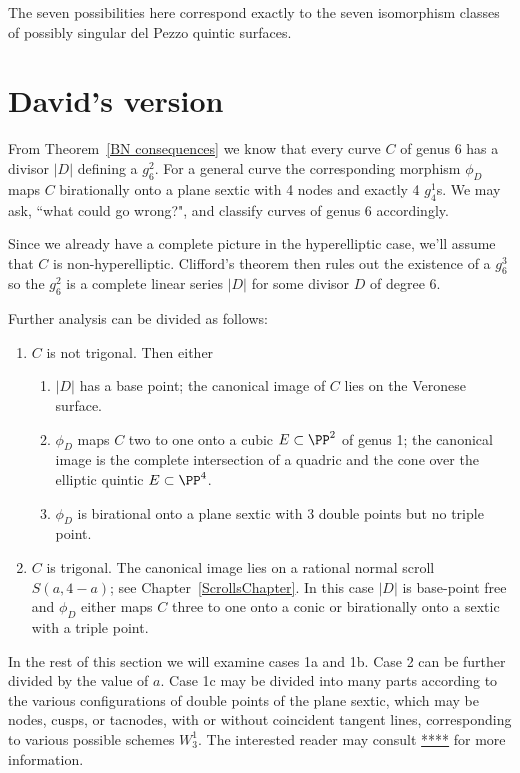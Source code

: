 \begin{fact}
The seven possibilities here correspond exactly to the seven isomorphism classes of possibly singular del Pezzo quintic surfaces.
\end{fact}

\section{David's version}

From Theorem~\ref{BN consequences}  we know that every curve $C$ of genus 6 has a divisor $|D|$
defining a $g^{2}_{6}$. For a general curve the corresponding morphism $\phi_{D}$ maps $C$ birationally onto a plane sextic with 4 nodes and exactly 4 $g^{1}_{4}$s. We may ask, ``what could go wrong?", and classify curves of genus 6 accordingly. 

Since we already have a complete picture in the hyperelliptic case, we'll assume that $C$ is non-hyperelliptic. Clifford's theorem then rules out
the existence of a $g^3_6$ so  the $g^2_6$ is a complete linear series  $|D|$ for some divisor $D$ of degree 6.


Further analysis can be divided as follows:
\begin{enumerate}
\item $C$ is not trigonal. Then either
\begin{enumerate}
 \item $|D|$ has a base point; the canonical image of $C$ lies on the Veronese surface.
\item $\phi_{D}$ maps $C$ two to one onto a cubic $E \subset \PP^2$ of genus 1; the canonical image is the complete intersection of a quadric and the cone over the elliptic quintic $E\subset \PP^{4}$.
\item $\phi_{D}$ is birational onto a plane sextic with 3 double points but no triple point.
 \end{enumerate}
 \item $C$ is trigonal. The canonical image lies on a 
rational normal scroll $S(a,4-a)$; see Chapter~\ref{ScrollsChapter}.
In this case $|D|$ is base-point free and $\phi_{D}$  either maps $C$ three to one onto a conic
 or birationally onto a sextic with a triple point. 
\end{enumerate}

In the rest of this section we will examine cases 1a and 1b. Case 2 can be further divided by the value of $a$.
Case 1c may be divided into many parts according to the various configurations
of double points of the plane sextic, which may be nodes, cusps, or tacnodes, with or without 
coincident tangent lines, corresponding to various possible schemes $W^{1}_{3}$. The interested reader may consult \url{****} for more information.

